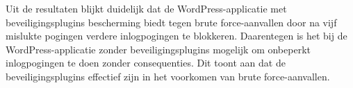 Uit de resultaten blijkt duidelijk dat de WordPress-applicatie met beveiligingsplugins bescherming biedt tegen brute 
force-aanvallen door na vijf mislukte pogingen verdere inlogpogingen te blokkeren. Daarentegen is het bij de 
WordPress-applicatie zonder beveiligingsplugins mogelijk om onbeperkt inlogpogingen te doen zonder consequenties. Dit toont 
aan dat de beveiligingsplugins effectief zijn in het voorkomen van brute force-aanvallen.